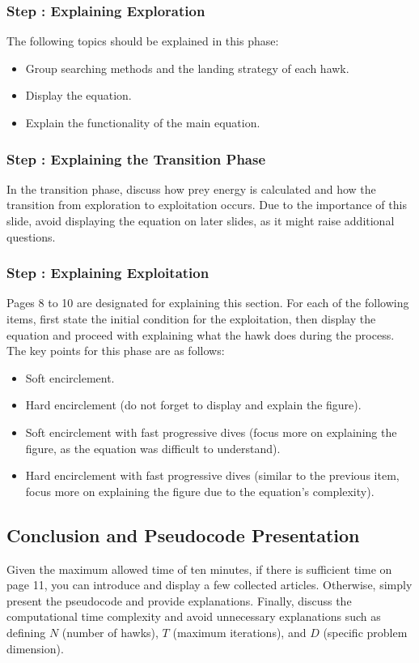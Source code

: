\documentclass[12pt]{article}
\begin{document}
\subsubsection*{Step : Explaining Exploration}
The following topics should be explained in this phase:
\begin{itemize}
    \item Group searching methods and the landing strategy of each hawk.
    \item Display the equation.
    \item Explain the functionality of the main equation.
\end{itemize}

\subsubsection*{Step : Explaining the Transition Phase}
In the transition phase, discuss how prey energy is calculated and how the transition from exploration to exploitation occurs.  
Due to the importance of this slide, avoid displaying the equation on later slides, as it might raise additional questions.

\subsubsection*{Step : Explaining Exploitation}
Pages 8 to 10 are designated for explaining this section.  
For each of the following items, first state the initial condition for the exploitation, then display the equation and proceed with explaining what the hawk does during the process.  
The key points for this phase are as follows:
\begin{itemize}
    \item Soft encirclement.
    \item Hard encirclement (do not forget to display and explain the figure).
    \item Soft encirclement with fast progressive dives (focus more on explaining the figure, as the equation was difficult to understand).
    \item Hard encirclement with fast progressive dives (similar to the previous item, focus more on explaining the figure due to the equation's complexity).
\end{itemize}

\subsection*{Conclusion and Pseudocode Presentation}
Given the maximum allowed time of ten minutes, if there is sufficient time on page 11, you can introduce and display a few collected articles.  
Otherwise, simply present the pseudocode and provide explanations.  
Finally, discuss the computational time complexity and avoid unnecessary explanations such as defining \( N \) (number of hawks), \( T \) (maximum iterations), and \( D \) (specific problem dimension).
\end{document}
